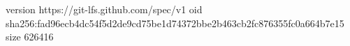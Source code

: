 version https://git-lfs.github.com/spec/v1
oid sha256:fad96ecb4dc54f5d2de9cd75be1d74372bbe2b463cb2fc876355fc0a664b7e15
size 626416
